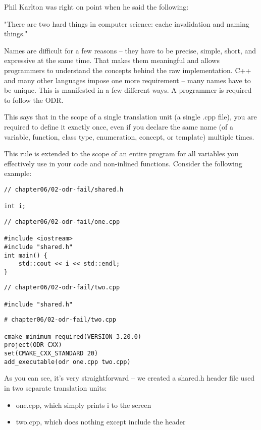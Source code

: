 
Phil Karlton was right on point when he said the following:

"There are two hard things in computer science: cache invalidation and naming things."

Names are difficult for a few reasons – they have to be precise, simple, short, and expressive at the same time. That makes them meaningful and allows programmers to understand the concepts behind the raw implementation. C++ and many other languages impose one more requirement – many names have to be unique. This is manifested in a few different ways. A programmer is required to follow the ODR.

This says that in the scope of a single translation unit (a single .cpp file), you are required to define it exactly once, even if you declare the same name (of a variable, function, class type, enumeration, concept, or template) multiple times.

This rule is extended to the scope of an entire program for all variables you effectively use in your code and non-inlined functions. Consider the following example:

\begin{lstlisting}[style=styleCXX]
// chapter06/02-odr-fail/shared.h

int i;
\end{lstlisting}

\begin{lstlisting}[style=styleCXX]
// chapter06/02-odr-fail/one.cpp

#include <iostream>
#include "shared.h"
int main() {
	std::cout << i << std::endl;
}
\end{lstlisting}

\begin{lstlisting}[style=styleCXX]
// chapter06/02-odr-fail/two.cpp
	
#include "shared.h"
\end{lstlisting}

\begin{lstlisting}[style=styleCMake]
# chapter06/02-odr-fail/two.cpp
	
cmake_minimum_required(VERSION 3.20.0)
project(ODR CXX)
set(CMAKE_CXX_STANDARD 20)
add_executable(odr one.cpp two.cpp)
\end{lstlisting}

As you can see, it's very straightforward – we created a shared.h header file used in two separate translation units:

\begin{itemize}
\item 
one.cpp, which simply prints i to the screen

\item 
two.cpp, which does nothing except include the header
\end{itemize}

